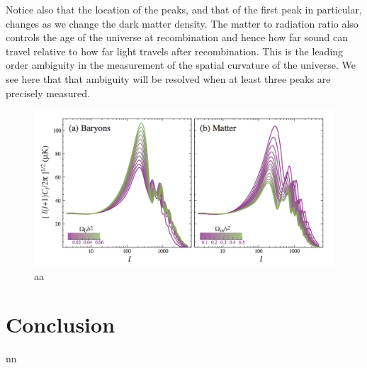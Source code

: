 \documentclass{article}
\begin{document}
Notice also that the location of the peaks, and that of the first peak in particular, changes as we change the dark matter density.  The matter to radiation ratio also controls the age of the universe at recombination and hence how far sound can travel relative to how far light travels after recombination.  This is the leading order ambiguity in the measurement of the spatial curvature of the universe.  We see here that that ambiguity will be resolved when at least three peaks are precisely measured.





\begin{figure}
\begin{center}
\includegraphics[width=\textwidth]{baryon_m}
\caption{aa}
\end{center}
\label{DM_bar}
\end{figure}
\section{Conclusion}
nn
\citep{padmanabhanDetectingDarkMatter2005}





\end{document}
